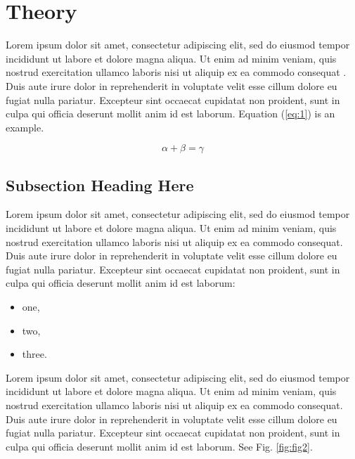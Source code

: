 \section{Theory}
Lorem ipsum dolor sit amet, consectetur adipiscing elit, sed do eiusmod tempor incididunt ut labore et dolore magna aliqua. Ut enim ad minim veniam, quis nostrud exercitation ullamco laboris nisi ut aliquip ex ea commodo consequat \cite{Sebastiano2017,Leermakers2019,Wang2021,Stefanovic2008}. Duis aute irure dolor in reprehenderit in voluptate velit esse cillum dolore eu fugiat nulla pariatur. Excepteur sint occaecat cupidatat non proident, sunt in culpa qui officia deserunt mollit anim id est laborum. Equation (\ref{eq:1}) is an example.


\begin{equation} \label{eq:1}
\alpha + \beta = \gamma
\end{equation}

\subsection{Subsection Heading Here}
Lorem ipsum dolor sit amet, consectetur adipiscing elit, sed do eiusmod tempor incididunt ut labore et dolore magna aliqua. Ut enim ad minim veniam, quis nostrud exercitation ullamco laboris nisi ut aliquip ex ea commodo consequat. Duis aute irure dolor in reprehenderit in voluptate velit esse cillum dolore eu fugiat nulla pariatur. Excepteur sint occaecat cupidatat non proident, sunt in culpa qui officia deserunt mollit anim id est laborum:

\begin{itemize}
	\item one,
	\item two,
	\item three.
\end{itemize}

Lorem ipsum dolor sit amet, consectetur adipiscing elit, sed do eiusmod tempor incididunt ut labore et dolore magna aliqua. Ut enim ad minim veniam, quis nostrud exercitation ullamco laboris nisi ut aliquip ex ea commodo consequat. Duis aute irure dolor in reprehenderit in voluptate velit esse cillum dolore eu fugiat nulla pariatur. Excepteur sint occaecat cupidatat non proident, sunt in culpa qui officia deserunt mollit anim id est laborum. See Fig. \ref{fig:fig2}.

